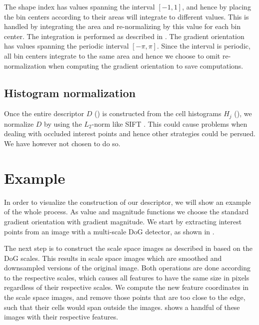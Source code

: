 \documentclass[thesis.tex]{subfiles}
\begin{document}
The shape index has values spanning the interval $[-1,1]$, and hence by placing the bin centers according to  their areas will integrate to different values. This is handled by integrating the area and re-normalizing by this value for each bin center. The integration is performed as described in . The gradient orientation has values spanning the periodic interval $[-\pi,\pi]$. Since the interval is periodic, all bin centers integrate to the same area and hence we choose to omit re-normalization when computing the gradient orientation to save computations.
%
\subsection{Histogram normalization}
Once the entire descriptor $D$ () is constructed from the cell histograms $H_j$ (), we normalize $D$ by using the $L_2$-norm like SIFT \cite{lowe2004distinctive}. This could cause problems when dealing with occluded interest points and hence other strategies could be persued. We have however not chosen to do so.

%
\section{Example}
%
In order to visualize the construction of our descriptor, we will show an example of the whole process. As value and magnitude functions we choose the standard gradient orientation with gradient magnitude. We start by extracting interest points from an image with a multi-scale DoG detector, as shown in .

The next step is to construct the scale space images as described in  based on the DoG scales. This results in scale space images which are smoothed and downsampled versions of the original image. Both operations are done according to the respective scales, which causes all features to have the same size in pixels regardless of their respective scales. We compute the new feature coordinates in the scale space images, and remove those points that are too close to the edge, such that their cells would span outside the images.  shows a handful of these images with their respective features.
\end{document}
